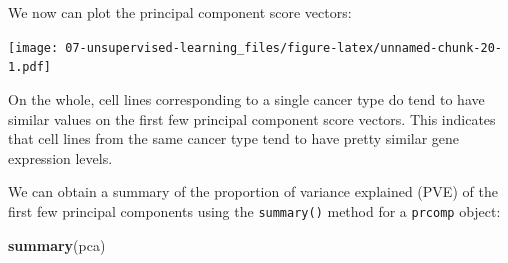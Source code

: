 \documentclass[openany]{book}
\newenvironment{Shaded}{\begin{snugshade}}{\end{snugshade}}
\newcommand{\DataTypeTok}[1]{\textcolor[rgb]{0.13,0.29,0.53}{#1}}
\newcommand{\DecValTok}[1]{\textcolor[rgb]{0.00,0.00,0.81}{#1}}
\newcommand{\KeywordTok}[1]{\textcolor[rgb]{0.13,0.29,0.53}{\textbf{#1}}}
\newcommand{\NormalTok}[1]{#1}
\newcommand{\OperatorTok}[1]{\textcolor[rgb]{0.81,0.36,0.00}{\textbf{#1}}}
\newcommand{\StringTok}[1]{\textcolor[rgb]{0.31,0.60,0.02}{#1}}
\begin{document}
We now can plot the principal component score vectors:

\begin{Shaded}
\end{Shaded}

\texttt{[image: 07-unsupervised-learning\_files/figure-latex/unnamed-chunk-20-1.pdf]}

On the whole, cell lines corresponding to a single cancer type do tend to have similar values on the
first few principal component score vectors. This indicates that cell lines
from the same cancer type tend to have pretty similar gene expression
levels.

We can obtain a summary of the proportion of variance explained (PVE)
of the first few principal components using the \texttt{summary()} method for a
\texttt{prcomp} object:

\begin{Shaded}
\begin{Highlighting}[]
\KeywordTok{summary}\NormalTok{(pca)}
\end{Highlighting}
\end{Shaded}
\end{document}
